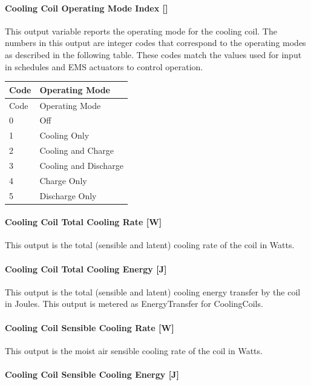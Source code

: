\paragraph{Cooling Coil Operating Mode Index {[]}}\label{cooling-coil-operating-mode-index}

This output variable reports the operating mode for the cooling coil. The numbers in this output are integer codes that correspond to the operating modes as described in the following table. These codes match the values used for input in schedules and EMS actuators to control operation.

\begin{longtable}[c]{@{}ll@{}}
\toprule
Code & Operating Mode \tabularnewline
\midrule
\endfirsthead

\toprule
Code & Operating Mode \tabularnewline
\midrule
\endhead

0 & Off \tabularnewline
1 & Cooling Only \tabularnewline
2 & Cooling and Charge \tabularnewline
3 & Cooling and Discharge \tabularnewline
4 & Charge Only \tabularnewline
5 & Discharge Only \tabularnewline
\bottomrule
\end{longtable}

\paragraph{Cooling Coil Total Cooling Rate {[}W{]}}\label{cooling-coil-total-cooling-rate-w-10}

This output is the total (sensible and latent) cooling rate of the coil in Watts.

\paragraph{Cooling Coil Total Cooling Energy {[}J{]}}\label{cooling-coil-total-cooling-energy-j-10}

This output is the total (sensible and latent) cooling energy transfer by the coil in Joules. This output is metered as EnergyTransfer for CoolingCoils.

\paragraph{Cooling Coil Sensible Cooling Rate {[}W{]}}\label{cooling-coil-sensible-cooling-rate-w-10}

This output is the moist air sensible cooling rate of the coil in Watts.

\paragraph{Cooling Coil Sensible Cooling Energy {[}J{]}}\label{cooling-coil-sensible-cooling-energy-j-10}

